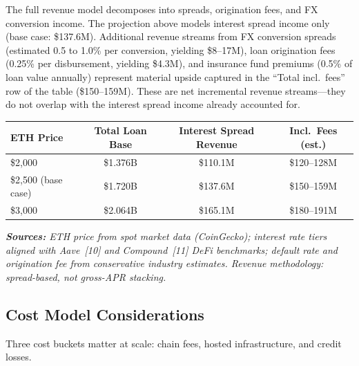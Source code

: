 \documentclass[12pt, a4paper]{report}
\newcommand{\tableheadcolor}{\rowcolor{TableHeadBg}}
\newcommand{\tableheadfont}{\bfseries}
\begin{document}
\vspace{2pt}

\vspace{4pt}

\vspace{4pt}
\noindent The full revenue model decomposes into spreads, origination fees, and FX conversion income. The projection above models interest spread income only (base case: \$137.6M). Additional revenue streams from FX conversion spreads (estimated 0.5 to 1.0\% per conversion, yielding \$8--17M), loan origination fees (0.25\% per disbursement, yielding \$4.3M), and insurance fund premiums (0.5\% of loan value annually) represent material upside captured in the ``Total incl.\ fees'' row of the table (\$150--159M). These are net incremental revenue streams---they do not overlap with the interest spread income already accounted for.

\begin{table}[H]
\centering
\begin{tabular}{@{}lccc@{}}
\toprule
\tableheadcolor
\tableheadfont ETH Price & \tableheadfont Total Loan Base & \tableheadfont Interest Spread Revenue & \tableheadfont Incl.\ Fees (est.) \\
\midrule
\$2{,}000 & \$1.376B & \$110.1M & \$120--128M \\
\rowcolor{RowShade}
\$2{,}500 (base case) & \$1.720B & \$137.6M & \$150--159M \\
\$3{,}000 & \$2.064B & \$165.1M & \$180--191M \\
\bottomrule
\end{tabular}
\end{table}

\vspace{4pt}
\noindent\textit{\small\textbf{Sources:} ETH price from spot market data (CoinGecko); interest rate tiers aligned with Aave~[10] and Compound~[11] DeFi benchmarks; default rate and origination fee from conservative industry estimates. Revenue methodology: spread-based, not gross-APR stacking.}

\subsection{Cost Model Considerations}
\label{sec:cost-model}
\label{sec:gas-cost}

Three cost buckets matter at scale: chain fees, hosted infrastructure, and credit losses.
\end{document}
